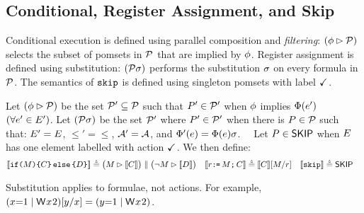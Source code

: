 

\subsection{Conditional, Register Assignment, and Skip}
Conditional execution is defined using parallel composition and
\emph{filtering}: $(\aForm \guard \aPSS)$ selects the subset of pomsets in
$\aPSS$ that are implied by $\aForm$.  Register assignment is defined using
substitution: $(\aPSS\aSub)$ performs the substitution $\aSub$ on every
formula in $\aPSS$.  The semantics of $\SKIP$ is defined using singleton
pomsets with label $\DSTOP$.
\begin{definition}
  Let $(\aForm \guard \aPSS)$ be the set $\aPSS'\subseteq\aPSS$ such that
  $\aPS'\in\aPSS'$ when $\aForm$ implies $\labelingForm(\aEv')$ %
  $(\forall\aEv'\in\Event')$. 
  Let $(\aPSS\aSub)$ be the set $\aPSS'$ where $\aPS'\in\aPSS'$ when there is
  $\aPS\in\aPSS$ such that: $\Event' = \Event$, ${\le'} = {\le}$,
  $\labelingAct' = \labelingAct$, and
  $\labelingForm'(\aEv) = \labelingForm(\aEv)\aSub$.
  \ \ Let $\aPS\in\stopPS$ when $\Event$ has one element labelled with action
  $\DSTOP$\!\!.
  We then define:
\begin{align*}
  \sem[\aThrd]{\IF{\aExp} \THEN \aCmd \ELSE \bCmd \FI} & \eqdef
  \bigl(\aExp \guard \sem[\aThrd]{\aCmd}\bigr) \parallel \bigl(\lnot\aExp \guard \sem[\aThrd]{\bCmd}\bigr) 
  &
  \sem[\aThrd]{\aReg\GETS\aExp\SEMI \aCmd} & \eqdef
  \sem[\aThrd]{\aCmd}[\aExp/\aReg] 
  &  
  \sem[\aThrd]{\SKIP} & \eqdef
  \stopPS
\end{align*}
\end{definition}
Substitution applies to formulae, not actions.  For example,
$(x{=}1\mid\DW{x}{2})[y/x]=(y{=}1\mid\DW{x}{2})$. %

